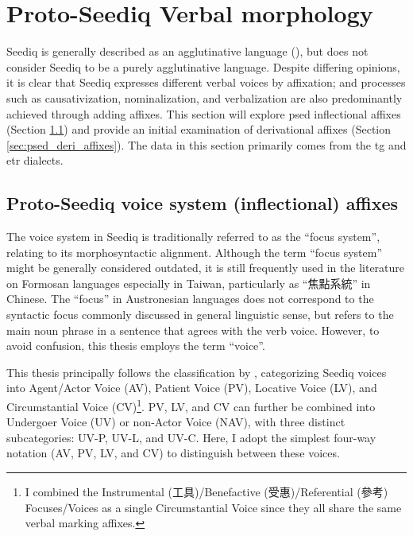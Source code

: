 \section{Proto-Seediq Verbal morphology} \label{sec:psed_aff}

Seediq is generally described as an agglutinative language (\cite{tsukida2012}), but \textcite{holmer1996parametric} does not consider Seediq to be a purely agglutinative language. Despite differing opinions, it is clear that Seediq expresses different verbal voices by affixation; and processes such as causativization, nominalization, and verbalization are also predominantly achieved through adding affixes. This section will explore \acl{psed} inflectional affixes (Section \ref{sec:psed_voice_affixes}) and provide an initial examination of derivational affixes (Section \ref{sec:psed_deri_affixes}). The data in this section primarily comes from the \acl{tg} and \acl{etr} dialects.

\subsection{Proto-Seediq voice system (inflectional) affixes} \label{sec:psed_voice_affixes}

The voice system in Seediq is traditionally referred to as the ``focus system'', relating to its morphosyntactic alignment. Although the term ``focus system'' might be generally considered outdated, it is still frequently used in the literature on Formosan languages especially in Taiwan, particularly as ``焦點系統'' in Chinese. The ``focus'' in Austronesian languages does not correspond to the syntactic focus commonly discussed in general linguistic sense, but refers to the main noun phrase in a sentence that agrees with the verb voice. However, to avoid confusion, this thesis employs the term ``voice''.

This thesis principally follows the classification by \textcite{Sung2018Sedgrammar,Lee2018Trugrammar}, categorizing Seediq voices into Agent/Actor Voice (AV), Patient Voice (PV), Locative Voice (LV), and Circumstantial Voice (CV)\footnote{I combined the Instrumental (工具)/Benefactive (受惠)/Referential (參考) Focuses/Voices as a single Circumstantial Voice since they all share the same verbal marking affixes.}. PV, LV, and CV can further be combined into Undergoer Voice (UV) or non-Actor Voice (NAV), with three distinct subcategories: UV-P, UV-L, and UV-C. Here, I adopt the simplest four-way notation (AV, PV, LV, and CV) to distinguish between these voices.

